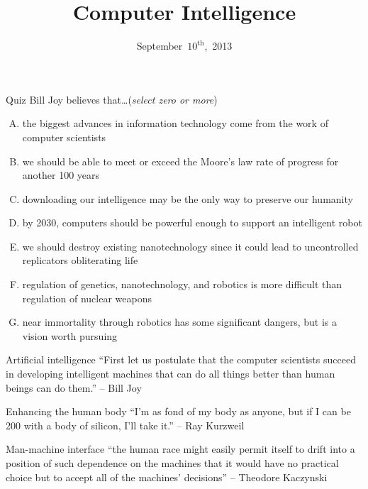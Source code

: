 \documentclass{beamer}
\title{Computer Intelligence}
\date{September~$10^{\text{th}}$,~2013}
\begin{document}
\begin{frame}
\titlepage
\end{frame}

\begin{frame}{Quiz}
Bill Joy believes that\ldots \hfill (\emph{select zero or more})
\begin{enumerate}[(A)]
\item<1> the biggest advances in information technology come from the work of computer scientists %
\item<1> we should be able to meet or exceed the Moore's law rate of progress for another 100 years %
\item<1> downloading our intelligence may be the only way to preserve our humanity %
\item<1-2> by 2030, computers should be powerful enough to support an intelligent robot
\item<1> we should destroy existing nanotechnology since it could lead to uncontrolled replicators obliterating life %
\item<1-2> regulation of genetics, nanotechnology, and robotics is more difficult than regulation of nuclear weapons %
\item<1> near immortality through robotics has some significant dangers, but is a vision worth pursuing
\end{enumerate}
\end{frame}

\begin{frame}{Artificial intelligence}
``First let us postulate that the computer scientists succeed in developing intelligent machines that can do all things better than human beings can do them.'' -- Bill Joy \\
\bigskip
\href{http://www.npr.org/player/v2/mediaPlayer.html?action=1&t=1&islist=false&id=155792609&m=155798855}{}
\end{frame}

\begin{frame}{Enhancing the human body}
``I'm as fond of my body as anyone, but if I can be 200 with a body of silicon, I'll take it.'' -- Ray Kurzweil \\
\bigskip
\href{http://www.youtube.com/watch?v=mO0xNI3xpmE}{}
\end{frame}

\begin{frame}{Man-machine interface}
``the human race might easily permit itself to drift into a position of such dependence on the machines that it would have no practical choice but to accept all of the machines' decisions'' -- Theodore Kaczynski \\
\bigskip
\href{https://www.youtube.com/watch?v=ogBX18maUiM}{}
\end{frame}
\end{document}
